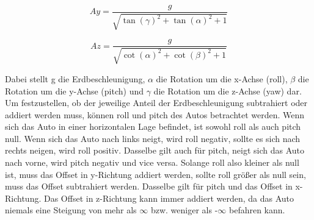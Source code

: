 \begin{equation}
Ay=\frac{g}{\sqrt{\tan(\gamma)^2+\tan(\alpha)^2+1}}
\label{eqn:imuFy}
\end{equation}

\begin{equation}
Az=\frac{g}{\sqrt{\cot(\alpha)^2+\cot(\beta)^2+1}}
\label{eqn:imuFz}
\end{equation}

Dabei stellt g die Erdbeschleunigung, $\alpha$ die Rotation um die x-Achse (roll), $\beta$ die Rotation um die y-Achse (pitch) und $\gamma$ die Rotation um die z-Achse (yaw) dar. \\
Um festzustellen, ob der jeweilige Anteil der Erdbeschleunigung subtrahiert oder addiert werden muss, können roll und pitch des Autos betrachtet werden. Wenn sich das Auto in einer horizontalen Lage befindet, ist sowohl roll als auch pitch null. Wenn sich das Auto nach links neigt, wird roll negativ, sollte es sich nach rechts neigen, wird roll positiv. Dasselbe gilt auch für pitch, neigt sich das Auto nach vorne, wird pitch negativ und vice versa. Solange roll also kleiner als null ist, muss das Offset in y-Richtung addiert werden, sollte roll größer als null sein, muss das Offset subtrahiert werden. Dasselbe gilt für pitch und das Offset in x-Richtung. Das Offset in z-Richtung kann immer addiert werden, da das Auto niemals eine Steigung von mehr als $\infty$ bzw. weniger als -$\infty$ befahren kann.